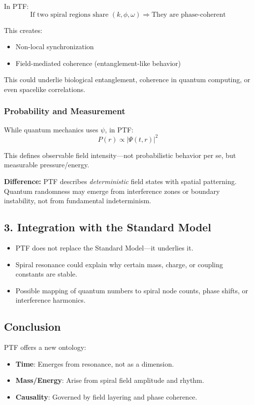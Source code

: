 \documentclass[a4paper,12pt]{article}
\begin{document}
In PTF:
\[
\text{If two spiral regions share } (k, \phi, \omega) \Rightarrow \text{They are phase-coherent}
\]

This creates:
\begin{itemize}
    \item Non-local synchronization
    \item Field-mediated coherence (entanglement-like behavior)
\end{itemize}

This could underlie biological entanglement, coherence in quantum computing, or even spacelike correlations.

\subsubsection*{Probability and Measurement}

While quantum mechanics uses $\psi$, in PTF:
\[
P(r) \propto |\Psi(t, r)|^2
\]

This defines observable field intensity—not probabilistic behavior per se, but measurable pressure/energy.

\textbf{Difference:}  
PTF describes \textit{deterministic} field states with spatial patterning. Quantum randomness may emerge from interference zones or boundary instability, not from fundamental indeterminism.

\subsection{3. Integration with the Standard Model}

\begin{itemize}
    \item PTF does not replace the Standard Model—it underlies it.
    \item Spiral resonance could explain why certain mass, charge, or coupling constants are stable.
    \item Possible mapping of quantum numbers to spiral node counts, phase shifts, or interference harmonics.
\end{itemize}

\subsection{Conclusion}

PTF offers a new ontology:
\begin{itemize}
    \item \textbf{Time}: Emerges from resonance, not as a dimension.
    \item \textbf{Mass/Energy}: Arise from spiral field amplitude and rhythm.
    \item \textbf{Causality}: Governed by field layering and phase coherence.
\end{itemize}
\end{document}
